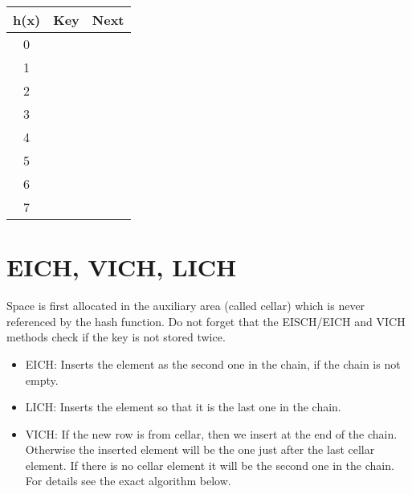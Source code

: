 \begin{tabular}{|c|c|c|}
\hline
h(x) & Key & Next \\ \hline\hline
0 & \hspace{3cm} & \hspace{1cm} \\ \hline
1 & \hspace{3cm} & \hspace{1cm} \\ \hline
2 & \hspace{3cm} & \hspace{1cm} \\ \hline
3 & \hspace{3cm} & \hspace{1cm} \\ \hline
4 & \hspace{3cm} & \hspace{1cm} \\ \hline
5 & \hspace{3cm} & \hspace{1cm} \\ \hline
6 & \hspace{3cm} & \hspace{1cm} \\ \hline
7 & \hspace{3cm} & \hspace{1cm} \\ \hline
\end{tabular}

\section*{EICH, VICH, LICH}
Space is first allocated in the auxiliary area (called cellar) which is never referenced by the hash function. Do not forget that the EISCH/EICH and VICH methods check if the key is not stored twice.
\begin{itemize}
\item EICH: Inserts the element as the second one in the chain, if the chain is not empty.
\item LICH: Inserts the element so that it is the last one in the chain.
\item VICH: If the new row is from cellar, then we insert at the end of the chain. Otherwise the inserted element will be the one just after the last cellar element. If there is no cellar element it will be the second one in the chain. For details see the exact algorithm below.
\end{itemize}

